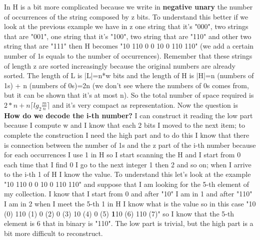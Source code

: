 In H is a bit more complicated because we write in \textbf{negative unary} the number of occurrences of the string composed by z bits. To understand this better if we look at the previous example we have in z one string that it's "000", two strings that are "001", one string that it's "100", two string that are "110" and other two string that are "111" then H becomes "10 110 0 0 10 0 110 110" (we add a certain number of 1s equals to the number of occurrences). Remember that these strings of length z are sorted increasingly because the original numbers are already sorted.\newline
The length of L is |L|=n*w bits and the length of H is |H|=n (numbers of 1s) + n (numbers of 0s)=2n (we don't see where the numbers of 0s comes from, but it can be shown that it's at most n).\newline
So the total number of space required is $2*n+n\lceil lg_2 \frac{m}{n} \rceil$ and it's very compact as representation.\newline
Now the question is \textbf{How do we decode the i-th number?} I can construct it reading the low part because I compute w and I know that each 2 bits I moved to the next item; to complete the construction I need the high part and to do this I know that there is connection between the number of 1s and the z part of the i-th number because for each occurrences I use 1 in H so I start scanning the H and I start from 0 each time that I find 0 I go to the next integer 1 then 2 and so on; when I arrive to the i-th 1 of H I know the value. To understand this let's look at the example "10 110 0 0 10 0 110 110" and suppose that I am looking for the 5-th element of my collection. I know that I start from 0 and after "10" I am in 1 and after "110" I am in 2 when I meet the 5-th 1 in H I know what is the value so in this case "10 (0) 110 (1) 0 (2) 0 (3) 10 (4) 0 (5) \textbf{1}10 (6) 110 (7)" so I know that the 5-th element is 6 that in binary is "110".\newline
The low part is trivial, but the high part is a bit more difficult to reconstruct.\newline
